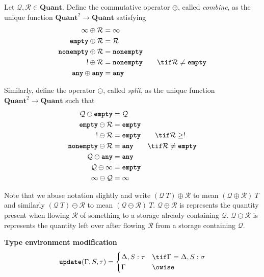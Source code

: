\documentclass[10pt]{article}
\begin{document}
\begin{definition}
    Let $\mathcal{Q}, \mathcal{R} \in \textbf{Quant}$.
    Define the commutative operator $\oplus$, called \emph{combine}, as the unique function $\textbf{Quant}^2 \to \textbf{Quant}$ satisfying
    \begin{align*}
        \infty \oplus \mathcal{R} &= \infty \\
        \emptyq \oplus \mathcal{R} &= \mathcal{R} \\
        \nonempty \oplus \mathcal{R} &= \nonempty \\
        ! \oplus \mathcal{R} &= \nonempty \qquad \tif \mathcal{R} \neq \emptyq \\
        \any \oplus \any &= \any
    \end{align*}

    Similarly, define the operator $\ominus$, called \emph{split}, as the unique function $\textbf{Quant}^2 \to \textbf{Quant}$ such that
    \begin{align*}
        \mathcal{Q} \ominus \emptyq & = \mathcal{Q} \\
        \emptyq \ominus \mathcal{R} & = \emptyq \\
        ! \ominus \mathcal{R} &= \emptyq \qquad \tif \mathcal{R} \geq ! \\
        \nonempty \ominus \mathcal{R} &= \any \qquad \tif \mathcal{R} \neq \emptyq \\
        \mathcal{Q} \ominus \any &= \any \\
        \mathcal{Q} \ominus \infty & = \emptyq \\
        \infty \ominus \mathcal{Q} &= \infty
    \end{align*}
\end{definition}

Note that we abuse notation slightly and write $(\mathcal{Q}~T) \oplus \mathcal{R}$ to mean $(\mathcal{Q} \oplus \mathcal{R})~T$ and similarly $(\mathcal{Q}~T) \ominus \mathcal{R}$ to mean $(\mathcal{Q} \ominus \mathcal{R})~T$.
$\mathcal{Q} \oplus \mathcal{R}$ is represents the quantity present when flowing $\mathcal{R}$ of something to a storage already containing $\mathcal{Q}$.
$\mathcal{Q} \ominus \mathcal{R}$ is represents the quantity left over after flowing $\mathcal{R}$ from a storage containing $\mathcal{Q}$.

 \textbf{Type environment modification}
\[
    \update(\Gamma, S, \tau) =
    \begin{cases}
        \Delta, S : \tau & \tif \Gamma = \Delta, S : \sigma \\
        \Gamma & \owise
    \end{cases}
\]
\end{document}
